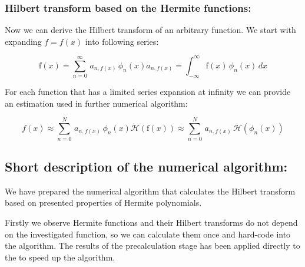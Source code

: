 \documentclass[12pt,twoside,a4paper]{article}
\numberwithin{equation}{subsection}
\numberwithin{figure}{subsection}
\begin{document}
\subsubsection*{Hilbert transform based on the Hermite functions:}

Now we can derive the Hilbert transform of an arbitrary function. We start with expanding $f = f(x)$ into following series:

\begin{subequations} \label{eq:hermite_fexpand}
  \begin{equation}   \label{eq:hfe_f}
     \mathrm{f}(x) = \sum_{n = 0}^{\infty } \, a_{n, f(x)} \, \phi_n(x) 
  \end{equation}
  \begin{equation}   \label{eq:hfe_an}
     a_{n, f(x)} = \int_{ - \infty }^{\infty } \mathrm{f}(x) \, \phi_n (x) \, dx
  \end{equation}
\end{subequations}

For each function that has a limited series expansion at infinity we can provide an estimation used in further numerical algorithm:

\begin{subequations} \label{eq:hermite_estimate}
  \begin{equation}   \label{eq:hest_fapprox}
      f(x) \approx \sum_{n = 0}^{N} \, a_{n, f(x)} \, \phi_n (x)
  \end{equation}
  \begin{equation}   \label{eq:hest_happrox}
     \mathcal{H} (\mathrm{f}(x)) \approx \sum_{n = 0} ^ {N} \, a_{n, f(x)} \, \mathcal{H}(\phi_n (x))
  \end{equation}
\end{subequations}

\subsection*{Short description of the numerical algorithm:}

We have prepared the numerical algorithm that calculates the Hilbert transform based on presented properties of Hermite polynomials. 

Firstly we observe Hermite functions and their Hilbert transforms do not depend on the investigated function, so we can calculate them once and hard-code into the algorithm. The results of the precalculation stage has been applied directly to the to speed up the algorithm.
\end{document}
